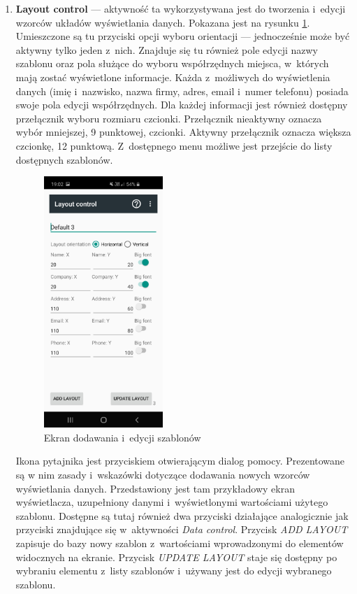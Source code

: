 \documentclass[a4paper,12pt, twoside]{article}
\begin{document}
\begin{enumerate}
    	   \item \textbf{Layout control} — aktywność ta wykorzystywana jest do tworzenia i~edycji wzorców układów wyświetlania danych. Pokazana jest na rysunku \ref{fig:layoutControl}. Umieszczone są tu przyciski opcji wyboru orientacji — jednocześnie może być aktywny tylko jeden z~nich. Znajduje się tu również pole edycji nazwy szablonu oraz pola służące do wyboru współrzędnych miejsca, w~których mają zostać wyświetlone informacje. Każda z~możliwych do wyświetlenia danych (imię i~nazwisko, nazwa firmy, adres, email i~numer telefonu) posiada swoje pola edycji współrzędnych. Dla każdej informacji jest również dostępny przełącznik wyboru rozmiaru czcionki. Przełącznik nieaktywny oznacza wybór mniejszej, 9 punktowej, czcionki. Aktywny przełącznik oznacza większa czcionkę, 12 punktową. Z~dostępnego menu możliwe jest przejście do listy dostępnych szablonów. 
    	   \begin{figure}[H]
    	        \centering
    	        \includegraphics[width=4.5cm]{images/view_layoutEdit.jpg}
    			\caption{ Ekran dodawania i~edycji szablonów}
                \label{fig:layoutControl}
    	   \end{figure}
    	   Ikona pytajnika jest przyciskiem otwierającym dialog pomocy. Prezentowane są w nim zasady i~wskazówki dotyczące dodawania nowych wzorców wyświetlania danych. Przedstawiony jest tam przykładowy ekran wyświetlacza, uzupełniony danymi i~wyświetlonymi wartościami użytego szablonu.
    	   Dostępne są tutaj również dwa przyciski działające analogicznie jak przyciski znajdujące się w~aktywności \textit{Data control}. Przycisk \textit{ADD LAYOUT} zapisuje do bazy nowy szablon z~wartościami wprowadzonymi do elementów widocznych na ekranie. Przycisk \textit{UPDATE LAYOUT} staje się dostępny po wybraniu elementu z~listy szablonów i~używany jest do edycji wybranego szablonu.
    	   

\end{enumerate}
\end{document}
